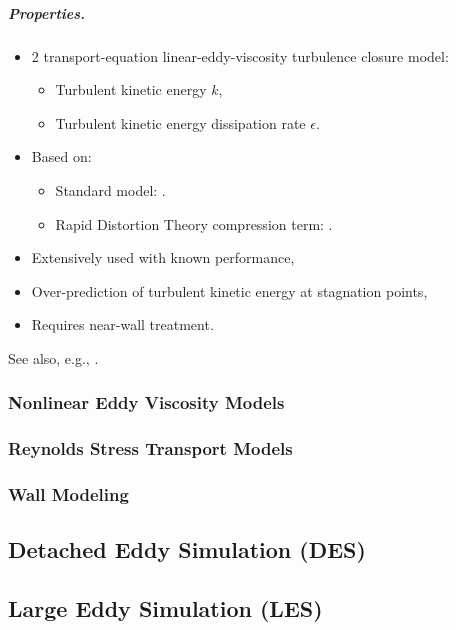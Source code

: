 \documentclass{article}
\numberwithin{equation}{section}
\begin{document}
\subparagraph{Properties.}
\begin{itemize}
	\item 2 transport-equation linear-eddy-viscosity turbulence closure model:
	\begin{itemize}
		\item Turbulent kinetic energy $k$,
		\item Turbulent kinetic energy dissipation rate $\epsilon$.
	\end{itemize}
	\item Based on:
	\begin{itemize}
		\item Standard model: \cite{Launder_Spalding1974}.
		\item Rapid Distortion Theory compression term: \cite{ElTahry1983}.
	\end{itemize}
	\item Extensively used with known performance,
	\item Over-prediction of turbulent kinetic energy at stagnation points,
	\item Requires near-wall treatment.
\end{itemize}
See also, e.g., \cite[Chap. 17]{Moukalled_Mangani_Darwish2016}.

\subsubsection{Nonlinear Eddy Viscosity Models}

\subsubsection{Reynolds Stress Transport Models}

\subsubsection{Wall Modeling}

\subsection{Detached Eddy Simulation (DES)}

\subsection{Large Eddy Simulation (LES)}

\end{document}
